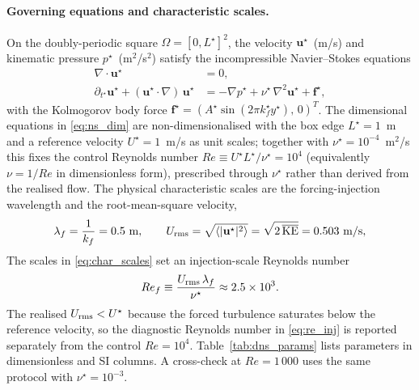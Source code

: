 \paragraph{Governing equations and characteristic scales.}
On the doubly-periodic square $\Omega = [0, L^\star]^2$, the velocity $\mathbf{u}^\star$~(m/s) and kinematic pressure $p^\star$~(m$^2$/s$^2$) satisfy the incompressible Navier--Stokes equations
\begin{subequations}
\label{eq:ns_dim}
\begin{align}
    \nabla\!\cdot\!\mathbf{u}^\star &= 0, \\
    \partial_{t^\star}\mathbf{u}^\star + (\mathbf{u}^\star\!\cdot\!\nabla)\,\mathbf{u}^\star &= -\nabla p^\star + \nu^\star\,\nabla^2\mathbf{u}^\star + \mathbf{f}^\star,
\end{align}
\end{subequations}
with the Kolmogorov body force $\mathbf{f}^\star = (A^\star \sin(2\pi k_f^\star y^\star),\, 0)^T$. The dimensional equations in \eqref{eq:ns_dim} are non-dimensionalised with the box edge $L^\star = 1$~m and a reference velocity $U^\star = 1$~m/s as unit scales; together with $\nu^\star = 10^{-4}$~m$^2$/s this fixes the control Reynolds number $Re \equiv U^\star L^\star/\nu^\star = 10^4$ (equivalently $\nu = 1/Re$ in dimensionless form), prescribed through $\nu^\star$ rather than derived from the realised flow. The physical characteristic scales are the forcing-injection wavelength and the root-mean-square velocity,
\begin{equation}
    \label{eq:char_scales}
    \lambda_f = \frac{1}{k_f} = 0.5~\text{m}, \qquad
    U_{\rm rms} = \sqrt{\langle|\mathbf{u}^\star|^2\rangle} = \sqrt{2\,\overline{\mathrm{KE}}} = 0.503~\text{m/s},
\end{equation}
The scales in \eqref{eq:char_scales} set an injection-scale Reynolds number
\begin{equation}
    \label{eq:re_inj}
    Re_f \equiv \frac{U_{\rm rms}\,\lambda_f}{\nu^\star} \approx 2.5\times 10^3 .
\end{equation}
The realised $U_{\rm rms} < U^\star$ because the forced turbulence saturates below the reference velocity, so the diagnostic Reynolds number in \eqref{eq:re_inj} is reported separately from the control $Re = 10^4$. Table~\ref{tab:dns_params} lists parameters in dimensionless and SI columns. A cross-check at $Re=1\,000$ uses the same protocol with $\nu^\star = 10^{-3}$.

